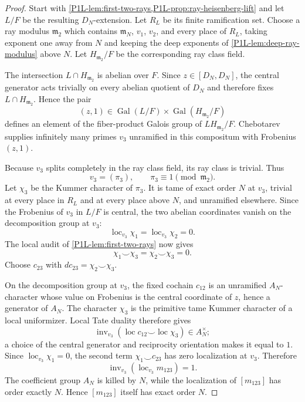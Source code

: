 \documentclass[11pt]{article}
\theoremstyle{remark}
\providecommand{\Gal}{\operatorname{Gal}}
\providecommand{\loc}{\operatorname{loc}}
\providecommand{\inv}{\operatorname{inv}}
\begin{document}
\begin{proof}
Start with \cref{P1L-lem:first-two-rays,P1L-prop:ray-heisenberg-lift} and let $L/F$ be the resulting $D_N$-extension.  Let $R_L$ be its finite ramification set.  Choose a ray modulus $\mathfrak m_2$ which contains $\mathfrak m_N$, $v_1$, $v_2$, and every place of $R_L$, taking exponent one away from $N$ and keeping the deep exponents of \cref{P1L-lem:deep-ray-modulus} above $N$.  Let $H_{\mathfrak m_2}/F$ be the corresponding ray class field.

The intersection $L\cap H_{\mathfrak m_2}$ is abelian over $F$.  Since $z\in[D_N,D_N]$, the central generator acts trivially on every abelian quotient of $D_N$ and therefore fixes $L\cap H_{\mathfrak m_2}$.  Hence the pair
\[
 (z,1)\in \Gal(L/F)\times\Gal(H_{\mathfrak m_2}/F)
\]
defines an element of the fiber-product Galois group of $LH_{\mathfrak m_2}/F$.  Chebotarev supplies infinitely many primes $v_3$ unramified in this compositum with Frobenius $(z,1)$.

Because $v_3$ splits completely in the ray class field, its ray class is trivial.  Thus
\[
 v_3=(\pi_3),\qquad \pi_3\equiv1\pmod{\mathfrak m_2}.
\]
Let $\chi_3$ be the Kummer character of $\pi_3$.  It is tame of exact order $N$ at $v_3$, trivial at every place in $R_L$ and at every place above $N$, and unramified elsewhere.  Since the Frobenius of $v_3$ in $L/F$ is central, the two abelian coordinates vanish on the decomposition group at $v_3$:
\[
 \loc_{v_3}\chi_1=\loc_{v_3}\chi_2=0.
\]
The local audit of \cref{P1L-lem:first-two-rays} now gives
\[
 \chi_1\smile\chi_3=\chi_2\smile\chi_3=0.
\]
Choose $c_{23}$ with $dc_{23}=\chi_2\smile\chi_3$.

On the decomposition group at $v_3$, the fixed cochain $c_{12}$ is an unramified $A_N$-character whose value on Frobenius is the central coordinate of $z$, hence a generator of $A_N$.  The character $\chi_3$ is the primitive tame Kummer character of a local uniformizer.  Local Tate duality therefore gives
\[
 \inv_{v_3}(\loc c_{12}\smile\loc\chi_3)\in A_N^\times;
\]
a choice of the central generator and reciprocity orientation makes it equal to $1$.  Since $\loc_{v_3}\chi_1=0$, the second term $\chi_1\smile c_{23}$ has zero localization at $v_3$.  Therefore
\[
 \inv_{v_3}(\loc_{v_3}m_{123})=1.
\]
The coefficient group $A_N$ is killed by $N$, while the localization of $[m_{123}]$ has order exactly $N$.  Hence $[m_{123}]$ itself has exact order $N$.
\end{proof}
\end{document}
